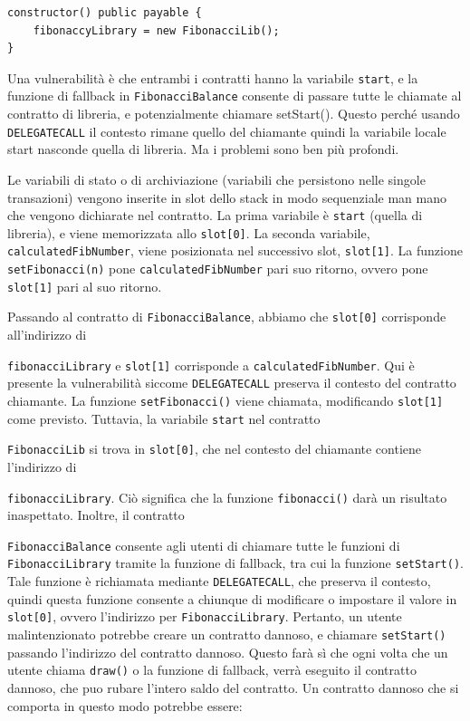 \begin{lstlisting}[language=Solidity]
constructor() public payable {
    fibonaccyLibrary = new FibonacciLib();
}
\end{lstlisting}

Una vulnerabilità è che entrambi i contratti hanno la variabile \texttt{start}, e la funzione di fallback in \texttt{FibonacciBalance} consente di passare tutte le chiamate al contratto di libreria, e potenzialmente chiamare setStart(). Questo perché usando \texttt{DELEGATECALL} il contesto rimane quello del chiamante quindi la variabile locale start nasconde quella di libreria. Ma i problemi sono ben più profondi.

Le variabili di stato o di archiviazione (variabili che persistono nelle singole transazioni) vengono inserite in slot dello stack in modo sequenziale man mano che vengono dichiarate nel contratto. La prima variabile è \texttt{start} (quella di libreria), e viene memorizzata allo \texttt{slot[0]}. La seconda variabile, \texttt{calculatedFibNumber}, viene posizionata nel successivo slot, \texttt{slot[1]}. La funzione \texttt{setFibonacci(n)} pone \texttt{calculatedFibNumber} pari suo ritorno, ovvero pone \texttt{slot[1]} pari al suo ritorno.

Passando al contratto di \texttt{FibonacciBalance}, abbiamo che \texttt{slot[0]} corrisponde all'indirizzo di

\texttt{fibonacciLibrary} e \texttt{slot[1]} corrisponde a \texttt{calculatedFibNumber}. Qui è presente la vulnerabilità siccome \texttt{DELEGATECALL} preserva il contesto del contratto chiamante. La funzione \texttt{setFibonacci()} viene chiamata, modificando \texttt{slot[1]} come previsto. Tuttavia, la variabile \texttt{start} nel contratto 

\texttt{FibonacciLib} si trova in \texttt{slot[0]}, che nel contesto del chiamante contiene l'indirizzo di

\texttt{fibonacciLibrary}. Ciò significa che la funzione \texttt{fibonacci()} darà un risultato inaspettato. Inoltre, il contratto 

\texttt{FibonacciBalance} consente agli utenti di chiamare tutte le funzioni di \texttt{FibonacciLibrary} tramite la funzione di fallback, tra cui la funzione \texttt{setStart()}. Tale funzione è richiamata mediante \texttt{DELEGATECALL}, che preserva il contesto, quindi questa funzione consente a chiunque di modificare o impostare il valore in 
\texttt{slot[0]}, ovvero l'indirizzo per \texttt{FibonacciLibrary}. Pertanto, un utente malintenzionato potrebbe creare un contratto dannoso, e chiamare \texttt{setStart()} passando l'indirizzo del contratto dannoso. Questo farà sì che ogni volta che un utente chiama \texttt{draw()} o la funzione di fallback, verrà eseguito il contratto dannoso, che puo rubare l'intero saldo del contratto. Un contratto dannoso che si comporta in questo modo potrebbe essere:

